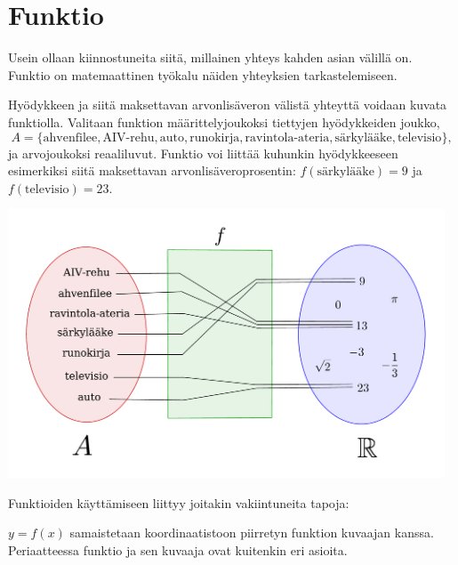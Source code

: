 \section{Funktio}

Usein ollaan kiinnostuneita siitä, millainen yhteys kahden asian välillä
on. Funktio on matemaattinen työkalu näiden yhteyksien tarkastelemiseen.


\begin{esimerkki}
Hyödykkeen ja siitä maksettavan arvonlisäveron välistä yhteyttä
voidaan kuvata funktiolla. Valitaan funktion määrittelyjoukoksi
tiettyjen hyödykkeiden joukko,
\[
A = \{\text{ahvenfilee}, \text{AIV-rehu}, \text{auto}, \text{runokirja}, \text{ravintola-ateria}, \text{särkylääke}, \text{televisio}\},
\]
ja arvojoukoksi reaaliluvut. Funktio voi liittää kuhunkin hyödykkeeseen
esimerkiksi siitä maksettavan arvonlisäveroprosentin:
$f(\text{särkylääke}) = 9$ ja $f(\text{televisio}) = 23$.

\begin{center}
\includegraphics[width=13cm]{pictures/funktiokone.pdf}
\end{center}
\end{esimerkki}

Funktioiden käyttämiseen liittyy joitakin vakiintuneita tapoja:
\begin{alakohdat}
$y = f(x)$ samaistetaan koordinaatistoon piirretyn funktion kuvaajan kanssa.
Periaatteessa funktio ja sen kuvaaja ovat kuitenkin eri asioita.
\end{alakohdat}

